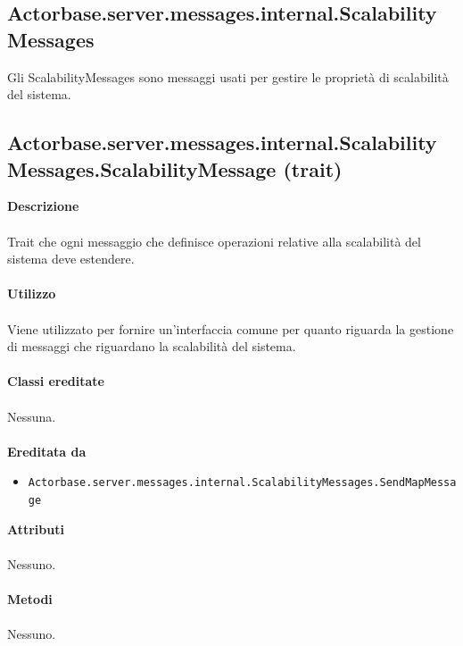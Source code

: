 \documentclass[a4paper]{article}
\begin{document}
	\subsection{Actorbase.server.messages.internal.ScalabilityMessages}
		Gli ScalabilityMessages sono messaggi usati per gestire le proprietà di scalabilità del sistema.
		
	\subsection{Actorbase.server.messages.internal.ScalabilityMessages.ScalabilityMessage (trait)}
		\textbf{Descrizione}
			\\ \\
			Trait che ogni messaggio che definisce operazioni relative alla scalabilità del sistema deve estendere.
			\\ \\
		\textbf{Utilizzo}
			\\ \\
			Viene utilizzato per fornire un'interfaccia comune per quanto riguarda la gestione di messaggi che riguardano la scalabilità del sistema.
			\\ \\
		\textbf{Classi ereditate}
			\\ \\
			Nessuna.
			\\ \\
		\textbf{Ereditata da}
			\begin{itemize}
				\item \texttt{Actorbase.server.messages.internal.ScalabilityMessages.SendMapMessage}
			\end{itemize}
		\textbf{Attributi}
			\\ \\
			Nessuno.
			\\ \\
		\textbf{Metodi}
			\\ \\
			Nessuno.
			
\end{document}
